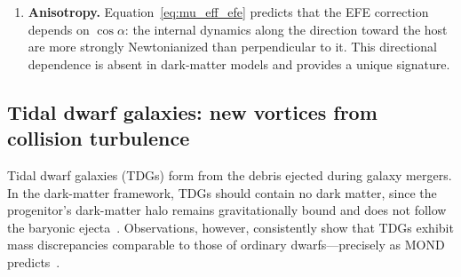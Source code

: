 \documentclass[11pt]{article}
\begin{document}
\begin{enumerate}
    Quantitatively, for a solar-neighbourhood binary with
    $m_1=m_2=M_\odot$ at separation $s$ in the Galactic external
    field $g_{\rm ext}\approx1.8\,a_0$:
    \begin{equation}\label{eq:wide_binary_prediction}
      \frac{\Delta v}{v_{\rm Kepler}}
      \;\approx\;
      \sqrt{\frac{1}{\mu_{\rm eff}}}-1\,,
      \qquad
      \mu_{\rm eff}
      \approx
      \frac{x_e}{1+x_e}
      +\frac{g_{\rm int}\cos\alpha}{a_0(1+x_e)^2}\,,
    \end{equation}
    with $x_e=g_{\rm ext}/a_0\approx1.8$ and
    the relative-orbit Newtonian acceleration
    $g_{\rm int}=G(m_1+m_2)/s^2$.
    At $s=10\,000\;\mathrm{AU}$:
    $g_{\rm int}/a_0\approx0.99$ for
    $a_0=1.2\times10^{-10}\,\mathrm{m\,s^{-2}}$,
    giving $\mu_{\rm eff}\approx0.643+0.13\cos\alpha$.  The
    $\alpha$-averaged scalar estimate gives
    $\Delta v/v_{\rm Kepler}\approx25\%$; the small-enhancement
    expansion $\tfrac12(1/\mu_{\rm eff}-1)$ gives $\approx28\%$
    and is only a rough expansion at this amplitude.  This excess is
    the EFE-reduced MOND signal, not the full isolated-MOND boost.
    The linear expansion~\eqref{eq:mu_eff_efe} is valid only
    for $g_{\rm int}\ll g_{\rm ext}$; already at
    $s=5\,000\;\mathrm{AU}$ one has $g_{\rm int}/a_0\approx4>x_e$,
    so the expansion fails there and a full numerical solution
    of~\eqref{eq:efe_mu} is required for quantitative predictions.
    The predicted $\sim 10\%$ directional anisotropy is a
    sharper falsifier than was previously recognised: it is
    at the edge of current \emph{Gaia}~DR3 proper-motion
    sensitivity and will be cleanly testable with
    \emph{Gaia}~DR4.
  \item \textbf{Anisotropy.}  Equation~\eqref{eq:mu_eff_efe} predicts
    that the EFE correction depends on $\cos\alpha$: the internal
    dynamics along the direction toward the host are more strongly
    Newtonianized than perpendicular to it.  This directional
    dependence is absent in dark-matter models and provides a
    unique signature.
\end{enumerate}

\subsection{Tidal dwarf galaxies: new vortices from collision turbulence}\label{sec:tidal_dwarfs}

Tidal dwarf galaxies (TDGs) form from the debris ejected during
galaxy mergers.  In the dark-matter framework, TDGs should contain
no dark matter, since the progenitor's dark-matter halo remains
gravitationally bound and does not follow the baryonic
ejecta~\cite{Bournaud2007}.  Observations, however, consistently
show that TDGs exhibit mass discrepancies comparable to those of
ordinary dwarfs---precisely as MOND
predicts~\cite{Gentile2007,Lelli2015}.
\end{document}
